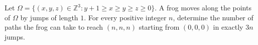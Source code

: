 \documentclass{article}
\begin{document}
\setlength{\parindent}{0pt}
Let \(\displaystyle \Omega=\{(x,y,z)\in \mathbb{Z}^3: y+1\ge x\ge y\ge z\ge 0\}\). A frog moves along the points of \(\displaystyle \Omega\) by jumps of length $1$. For every positive integer \(\displaystyle n\), determine the number of paths the frog can take to reach \(\displaystyle (n,n,n)\) starting from \(\displaystyle (0,0,0)\) in exactly \(\displaystyle 3n\) jumps.
\end{document}
